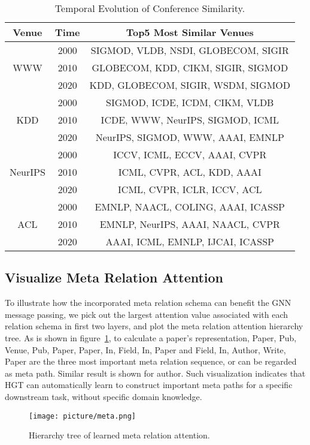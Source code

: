 \documentclass[sigconf]{acmart}
\theoremstyle{definition}
\begin{document}
{\begin{table}[th]
\centering
\begin{tabular}{ccc} 
\toprule
Venue & Time & Top5 Most Similar Venues \\
\midrule
\multirow{3}{*}{WWW} & 2000 & SIGMOD, VLDB, NSDI, GLOBECOM, SIGIR\\
~& 2010 & GLOBECOM, KDD, CIKM, SIGIR, SIGMOD\\
~& 2020 & KDD, GLOBECOM, SIGIR, WSDM, SIGMOD\\
\midrule
\multirow{3}{*}{KDD} & 2000 & SIGMOD, ICDE, ICDM, CIKM, VLDB\\
~& 2010 & ICDE, WWW, NeurIPS, SIGMOD, ICML\\
~& 2020 & NeurIPS, SIGMOD, WWW, AAAI, EMNLP\\
\midrule
\multirow{3}{*}{NeurIPS} & 2000 & ICCV, ICML, ECCV, AAAI, CVPR\\
~& 2010 & ICML, CVPR, ACL, KDD, AAAI\\
~& 2020 & ICML, CVPR, ICLR, ICCV, ACL\\
\midrule
\multirow{3}{*}{ACL} & 2000 & EMNLP, NAACL, COLING, AAAI, ICASSP\\
~& 2010 & EMNLP, NeurIPS, AAAI, NAACL, CVPR\\
~& 2020 & AAAI, ICML, EMNLP, IJCAI, ICASSP\\
\bottomrule
\end{tabular}
\caption{Temporal Evolution of Conference Similarity.} 
\label{tab:case} 
\end{table}

\subsection{Visualize Meta Relation Attention}
To illustrate how the incorporated meta relation schema can benefit the GNN message passing, we pick out the largest attention value associated with each relation schema in first two layers, and plot the meta relation attention hierarchy tree. As is shown in figure~\ref{fig:meta}, to calculate a paper's representation, Paper, Pub, Venue, Pub, Paper, Paper, In, Field, In, Paper and Field, In, Author, Write, Paper are the three most important meta relation sequence, or can be regarded as meta path. Similar result is shown for author. Such visualization indicates that HGT can automatically learn to construct important meta paths for a specific downstream task, without specific domain knowledge.

 \begin{figure}[ht!]
    \centering
    \texttt{[image: picture/meta.png]}
    \caption{Hierarchy tree of learned meta relation attention.}
    \label{fig:meta}
\end{figure} 

}%
 
\end{document}
